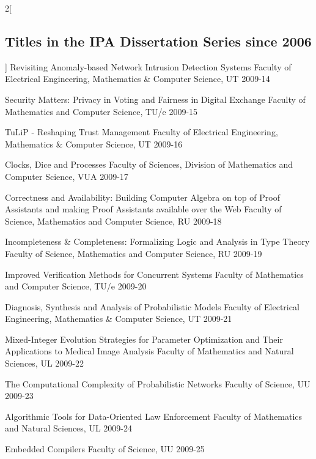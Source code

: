 \begin{multicols}{2}[\subsection*{Titles in the IPA Dissertation Series since 2006}]
         {Revisiting Anomaly-based Network Intrusion Detection Systems}
         {Faculty of Electrical Engineering, Mathematics \& Computer Science, UT}
         {2009-14}

         {Security Matters: Privacy in Voting and Fairness in Digital Exchange}
         {Faculty of Mathematics and Computer Science, TU/e}
         {2009-15}

         {TuLiP - Reshaping Trust Management}
         {Faculty of Electrical Engineering, Mathematics \& Computer Science, UT}
         {2009-16}

         {Clocks, Dice and Processes}
         {Faculty of Sciences, Division of Mathematics and Computer Science, VUA}
         {2009-17}

         {Correctness and Availability: Building Computer Algebra on top of Proof Assistants and making Proof Assistants available over the Web}
         {Faculty of Science, Mathematics and Computer Science, RU}
         {2009-18}

         {Incompleteness \& Completeness: Formalizing Logic and Analysis in Type Theory}
         {Faculty of Science, Mathematics and Computer Science, RU}
         {2009-19}

         {Improved Verification Methods for Concurrent Systems}
         {Faculty of Mathematics and Computer Science, TU/e}
         {2009-20}

         {Diagnosis, Synthesis and Analysis of Probabilistic Models}
         {Faculty of Electrical Engineering, Mathematics \& Computer Science, UT}
         {2009-21}

         {Mixed-Integer Evolution Strategies for Parameter Optimization and Their Applications to Medical Image Analysis}
         {Faculty of Mathematics and Natural Sciences, UL}
         {2009-22}

         {The Computational Complexity of Probabilistic Networks}
         {Faculty of Science, UU}
         {2009-23}

         {Algorithmic Tools for Data-Oriented Law Enforcement}
         {Faculty of Mathematics and Natural Sciences, UL}
         {2009-24}

         {Embedded Compilers}
         {Faculty of Science, UU}
         {2009-25}


\end{multicols}
